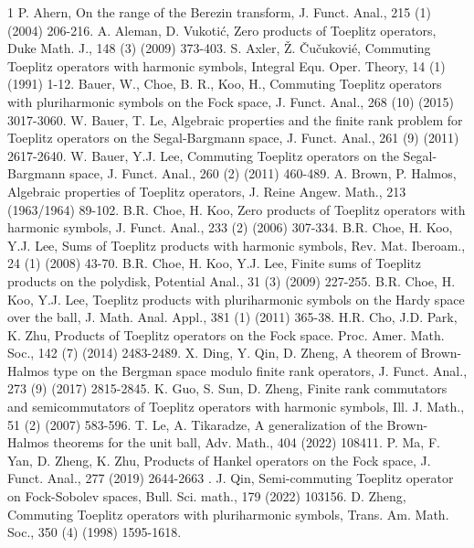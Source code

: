 \documentclass[11pt,reqno]{amsart}
\theoremstyle{definition}
\begin{document}
\providecommand{\MR}{\relax\ifhmode\unskip\space\fi MR }
\providecommand{\MRhref}[2]{%
  \href{http://www.ams.org/mathscinet-getitem?mr=#1}{#2}
}
\providecommand{\href}[2]{#2}
\begin{thebibliography}1
P. Ahern, On the range of the Berezin transform, J. Funct. Anal., 215 (1) (2004) 206-216.
A. Aleman,  D. Vukoti\'{c},  Zero products of Toeplitz operators, Duke Math. J., 148 (3) (2009) 373-403.
 S. Axler, \v{Z}. \v{C}u\v{c}ukovi\'{e}, Commuting Toeplitz operators with harmonic symbols, Integral Equ.
Oper. Theory, 14 (1) (1991) 1-12.
  Bauer, W., Choe, B. R., Koo, H., Commuting Toeplitz operators with pluriharmonic symbols on the Fock space, J. Funct. Anal., 268 (10) (2015) 3017-3060.
    W. Bauer, T. Le, Algebraic properties and the finite rank problem for Toeplitz operators on the
Segal-Bargmann space, J. Funct. Anal., 261 (9) (2011) 2617-2640.
W. Bauer, Y.J. Lee, Commuting Toeplitz operators on the Segal-Bargmann space, J. Funct. Anal.,
260 (2) (2011) 460-489.
    A. Brown, P. Halmos, Algebraic properties of Toeplitz operators, J. Reine Angew. Math., 213 (1963/1964) 89-102.
    B.R. Choe, H. Koo, Zero products of Toeplitz operators with harmonic symbols, J. Funct. Anal.,
233 (2) (2006) 307-334.
 B.R. Choe, H. Koo, Y.J. Lee, Sums of Toeplitz products with harmonic symbols, Rev. Mat. Iberoam.,
24 (1) (2008) 43-70.
 B.R. Choe, H. Koo, Y.J. Lee, Finite sums of Toeplitz products on the polydisk, Potential Anal.,
31 (3) (2009) 227-255.
 B.R. Choe, H. Koo, Y.J. Lee, Toeplitz products with pluriharmonic symbols on the Hardy space
over the ball, J. Math. Anal. Appl., 381 (1) (2011) 365-38.
 H.R. Cho, J.D. Park, K. Zhu, Products of Toeplitz operators on the Fock space. Proc. Amer. Math.
Soc., 142 (7) (2014) 2483-2489.
 X. Ding, Y. Qin, D. Zheng, A theorem of Brown-Halmos type on the Bergman space modulo finite
rank operators, J. Funct. Anal., 273 (9) (2017) 2815-2845.
 K. Guo, S. Sun, D. Zheng, Finite rank commutators and semicommutators of Toeplitz operators
with harmonic symbols, Ill. J. Math., 51 (2) (2007) 583-596.
T. Le, A. Tikaradze, A generalization of the Brown-Halmos theorems for
the unit ball, Adv. Math., 404 (2022) 108411.
  P. Ma, F. Yan, D. Zheng, K. Zhu, Products of Hankel operators on the Fock space, J. Funct.
Anal.,  277 (2019) 2644-2663 .
 J. Qin, Semi-commuting Toeplitz operator on Fock-Sobolev spaces, Bull. Sci. math., 179 (2022) 103156.
 D. Zheng, Commuting Toeplitz operators with pluriharmonic symbols, Trans. Am. Math. Soc.,
350 (4) (1998) 1595-1618.
\end{thebibliography}
\end{document}
